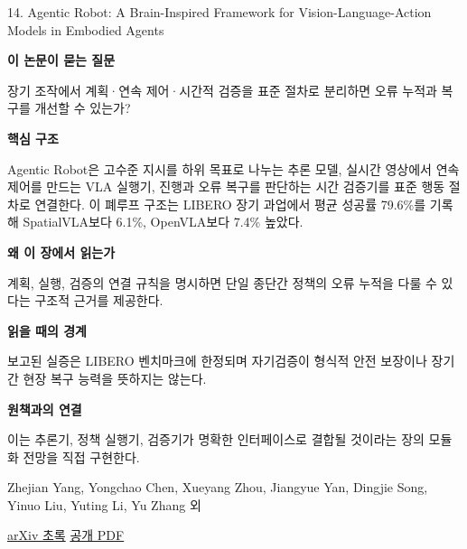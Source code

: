 \documentclass[11pt,openany]{book}
\begin{document}
\begin{termcard}{14. Agentic Robot: A Brain-Inspired Framework for Vision-Language-Action Models in Embodied Agents}

\par

\medskip

{\sffamily\bfseries\color{deepblue} 이 논문이 묻는 질문}\par

장기 조작에서 계획·연속 제어·시간적 검증을 표준 절차로 분리하면 오류 누적과 복구를 개선할 수 있는가?

\smallskip

{\sffamily\bfseries\color{deepblue} 핵심 구조}\par

Agentic Robot은 고수준 지시를 하위 목표로 나누는 추론 모델, 실시간 영상에서 연속 제어를 만드는 VLA 실행기, 진행과 오류 복구를 판단하는 시간 검증기를 표준 행동 절차로 연결한다. 이 폐루프 구조는 LIBERO 장기 과업에서 평균 성공률 79.6\%를 기록해 SpatialVLA보다 6.1\%, OpenVLA보다 7.4\% 높았다.

\smallskip

{\sffamily\bfseries\color{deepblue} 왜 이 장에서 읽는가}\par

계획, 실행, 검증의 연결 규칙을 명시하면 단일 종단간 정책의 오류 누적을 다룰 수 있다는 구조적 근거를 제공한다.

\smallskip

{\sffamily\bfseries\color{coral} 읽을 때의 경계}\par

보고된 실증은 LIBERO 벤치마크에 한정되며 자기검증이 형식적 안전 보장이나 장기간 현장 복구 능력을 뜻하지는 않는다.

\smallskip

{\sffamily\bfseries\color{teal} 원책과의 연결}\par

이는 추론기, 정책 실행기, 검증기가 명확한 인터페이스로 결합될 것이라는 장의 모듈화 전망을 직접 구현한다.

\medskip

{\footnotesize\color{muted} Zhejian Yang, Yongchao Chen, Xueyang Zhou, Jiangyue Yan, Dingjie Song, Yinuo Liu, Yuting Li, Yu Zhang 외\par

\href{https://arxiv.org/abs/2505.23450}{arXiv 초록} \quad \href{https://arxiv.org/pdf/2505.23450}{공개 PDF}\par}

\end{termcard}
\end{document}
